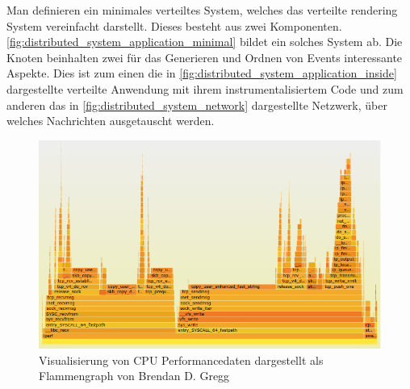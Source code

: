 Man definieren ein minimales verteiltes System, welches das verteilte rendering System vereinfacht darstellt. Dieses besteht aus zwei Komponenten. \cref{fig:distributed_system_application_minimal} bildet ein solches System ab. Die Knoten beinhalten zwei für das Generieren und Ordnen von Events interessante Aspekte. Dies ist zum einen die in \cref{fig:distributed_system_application_inside} dargestellte verteilte Anwendung mit ihrem instrumentalisiertem Code und zum anderen das in \cref{fig:distributed_system_network} dargestellte Netzwerk, über welches Nachrichten ausgetauscht werden. 

 \begin{figure}[!ht]
	\centering
	\includegraphics[scale=0.5]{img/Problembeschreibung/problembeschreibung_flamengraph.png}
	\caption[Visualisierung von CPU Performancedaten]{Visualisierung von CPU Performancedaten dargestellt als Flammengraph von Brendan D. Gregg \cite{BrendanGregg2011}}
	\label{fig:problembeschreibung_flamengraph}
\end{figure}

